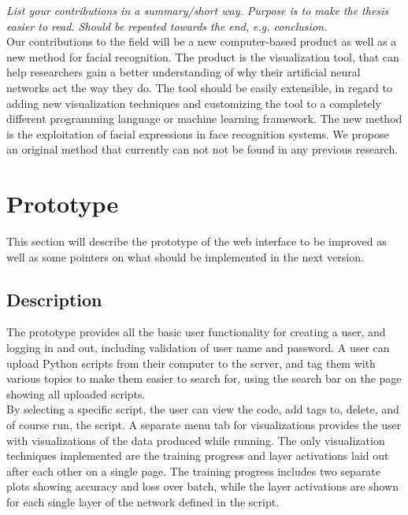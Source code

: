 \textit{List your contributions in a summary/short way. Purpose is to make the thesis easier to read. Should be repeated towards the end, e.g. conclusion.} \\

\noindent Our contributions to the field will be a new computer-based product as well as a new method for facial recognition. The product is the visualization tool, that can help researchers gain a better understanding of why their artificial neural networks act the way they do. The tool should be easily extensible, in regard to adding new visualization techniques and customizing the tool to a completely different programming language or machine learning framework. The new method is the exploitation of facial expressions in face recognition systems. We propose an original method that currently can not not be found in any previous research.

\section{Prototype}

This section will describe the prototype of the web interface to be improved as well as some pointers on what should be implemented in the next version.

\subsection{Description}

\noindent The prototype provides all the basic user functionality for creating a user, and logging in and out, including validation of user name and password. A user can upload Python scripts from their computer to the server, and tag them with various topics to make them easier to search for, using the search bar on the page showing all uploaded scripts. \\

\noindent By selecting a specific script, the user can view the code, add tags to, delete, and of course run, the script. A separate menu tab for visualizations provides the user with visualizations of the data produced while running. The only visualization techniques implemented are the training progress and layer activations laid out after each other on a single page. The training progress includes two separate plots showing accuracy and loss over batch, while the layer activations are shown for each single layer of the network defined in the script.

